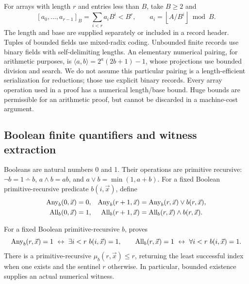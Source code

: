 For arrays with length \(r\) and entries less than \(B\), take \(B\ge2\) and
\[
 [a_0,\ldots,a_{r-1}]_B=\sum_{i<r}a_iB^i<B^r,
 \qquad a_i=\left\lfloor A/B^i\right\rfloor\bmod B.
\]
The length and base are supplied separately or included in a record header.
Tuples of bounded fields use mixed-radix coding. Unbounded finite records use
binary fields with self-delimiting lengths. An elementary numerical pairing,
for arithmetic purposes, is
\(\langle a,b\rangle=2^a(2b+1)-1\), whose projections use bounded division and
search. We do not assume this particular pairing is a length-efficient
serialization for reductions; those use explicit binary records. Every array
operation used in a proof has a numerical length/base bound. Huge bounds are
permissible for an arithmetic proof, but cannot be discarded in a machine-cost
argument.

\subsection{Boolean finite quantifiers and witness extraction}

Booleans are natural numbers 0 and 1. Their operations are primitive
recursive: \(\neg b=1\dotminus b\), \(a\wedge b=ab\), and
\(a\vee b=\min(1,a+b)\). For a fixed Boolean primitive-recursive predicate
\(b(i,\vec x)\), define
\begin{align*}
 \operatorname{Any}_b(0,\vec x)&=0,&
 \operatorname{Any}_b(r+1,\vec x)&=\operatorname{Any}_b(r,\vec x)\vee b(r,\vec x),\\
 \operatorname{All}_b(0,\vec x)&=1,&
 \operatorname{All}_b(r+1,\vec x)&=\operatorname{All}_b(r,\vec x)\wedge b(r,\vec x).
\end{align*}

\begin{lemma}
\label{lem:finite}
For a fixed Boolean primitive-recursive \(b\), \ipra{} proves
\[
 \Any_b(r,\vec x)=1\ \leftrightarrow\ \exists i<r\ b(i,\vec x)=1,
 \qquad
 \All_b(r,\vec x)=1\ \leftrightarrow\ \forall i<r\ b(i,\vec x)=1.
\]
There is a primitive-recursive \(\mu_b(r,\vec x)\le r\), returning the least
successful index when one exists and the sentinel \(r\) otherwise. In
particular, bounded existence supplies an actual numerical witness.
\end{lemma}

